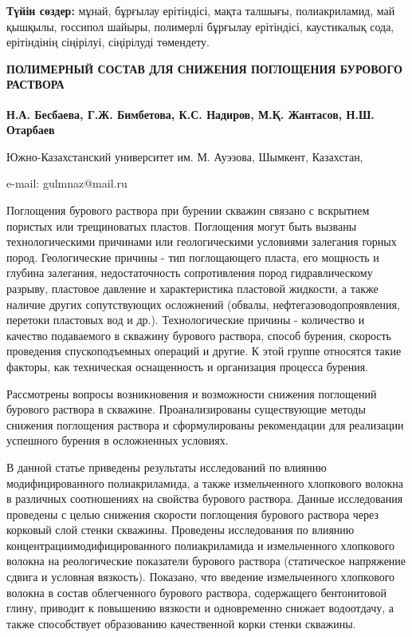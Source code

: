 {\bfseries Түйін сөздер:} мұнай, бұрғылау ерітіндісі, мақта талшығы,
полиакриламид, май қышқылы, госсипол шайыры, полимерлі бұрғылау
ерітіндісі, каустикалық сода, ерітіндінің сіңірілуі, сіңірілуді
төмендету.

\begin{articleheader}
{\bfseries ПОЛИМЕРНЫЙ СОСТАВ ДЛЯ СНИЖЕНИЯ ПОГЛОЩЕНИЯ БУРОВОГО РАСТВОРА}

{\bfseries
Н.А. Бесбаева,
Г.Ж. Бимбетова\textsuperscript{\envelope },
К.С. Надиров,
М.Қ. Жантасов,
Н.Ш. Отарбаев
}
\end{articleheader}

\begin{affiliation}
Южно-Казахстанский университет им. М. Ауэзова, Шымкент, Казахстан,

e-mail: gulmnaz@mail.ru
\end{affiliation}

Поглощения бурового раствора при бурении скважин связано с вскрытием
пористых или трещиноватых пластов. Поглощения могут быть вызваны
технологическими причинами или геологическими условиями залегания горных
пород. Геологические причины - тип поглощающего пласта, его мощность и
глубина залегания, недостаточность сопротивления пород гидравлическому
разрыву, пластовое давление и характеристика пластовой жидкости, а также
наличие других сопутствующих осложнений (обвалы,
нефтегазоводопроявления, перетоки пластовых вод и др.). Технологические
причины - количество и качество подаваемого в скважину бурового
раствора, способ бурения, скорость проведения спускоподъемных операций и
другие. К этой группе относятся такие факторы, как техническая
оснащенность и организация процесса бурения.

Рассмотрены вопросы возникновения и возможности снижения поглощений
бурового раствора в скважине. Проанализированы существующие методы
снижения поглощения раствора и сформулированы рекомендации для
реализации успешного бурения в осложненных условиях.

В данной статье приведены результаты исследований по влиянию
модифицированного полиакриламида, а также измельченного хлопкового
волокна в различных соотношениях на свойства бурового раствора. Данные
исследования проведены с целью снижения скорости поглощения бурового
раствора через корковый слой стенки скважины. Проведены исследования по
влиянию концентрациимодифицированного полиакриламида и измельченного
хлопкового волокна на реологические показатели бурового раствора
(статическое напряжение сдвига и условная вязкость). Показано, что
введение измельченного хлопкового волокна в состав облегченного бурового
раствора, содержащего бентонитовой глину, приводит к повышению вязкости
и одновременно снижает водоотдачу, а также способствует образованию
качественной корки стенки скважины.


